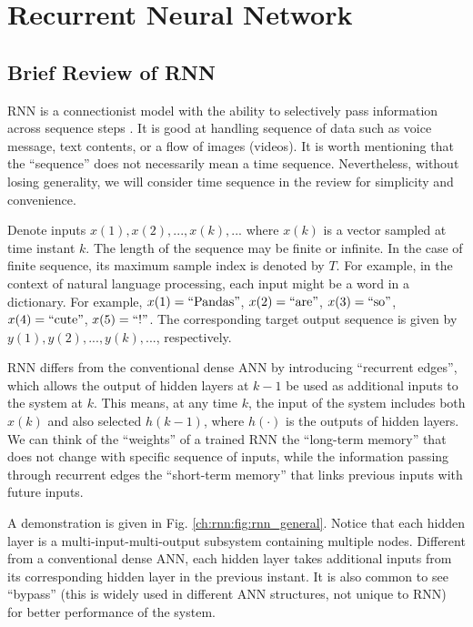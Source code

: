 \chapter{Recurrent Neural Network}

\section{Brief Review of RNN}

RNN is a connectionist model with the ability to selectively pass information across sequence steps \cite{lipton2015critical}. It is good at handling sequence of data such as voice message, text contents, or a flow of images (videos). It is worth mentioning that the ``sequence'' does not necessarily mean a time sequence. Nevertheless, without losing generality, we will consider time sequence in the review for simplicity and convenience.

Denote inputs $x(1), x(2), ..., x(k), ...$ where $x(k)$ is a vector sampled at time instant $k$. The length of the sequence may be finite or infinite. In the case of finite sequence, its maximum sample index is denoted by $T$. For example, in the context of natural language processing, each input might be a word in a dictionary. For example, $x(1) = \textup{``Pandas''}$, $x(2)=\textup{``are''}$, $x(3)=\textup{``so''}$, $x(4)=\textup{``cute''}$, $x(5)=\textup{``!''}$. The corresponding target output sequence is given by $y(1), y(2), ..., y(k), ...$, respectively.

RNN differs from the conventional dense ANN by introducing ``recurrent edges'', which allows the output of hidden layers at $k-1$ be used as additional inputs to the system at $k$. This means, at any time $k$, the input of the system includes both $x(k)$ and also selected $h(k-1)$, where $h(\cdot)$ is the outputs of hidden layers. We can think of the ``weights'' of a trained RNN the ``long-term memory'' that does not change with specific sequence of inputs, while the information passing through recurrent edges the ``short-term memory'' that links previous inputs with future inputs.

A demonstration is given in Fig. \ref{ch:rnn:fig:rnn_general}. Notice that each hidden layer is a multi-input-multi-output subsystem containing multiple nodes. Different from a conventional dense ANN, each hidden layer takes additional inputs from its corresponding hidden layer in the previous instant. It is also common to see ``bypass'' (this is widely used in different ANN structures, not unique to RNN) for better performance of the system.

